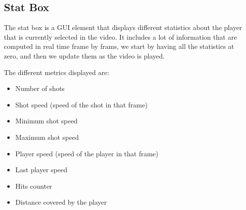 \subsection{Stat Box}

The stat box is a GUI element that displays different statistics about the player that is currently selected in the video. 
It includes a lot of information that are computed in real time frame by frams, we start by having all the statistics at zero, and then we update them as the video is played.

The different metrics displayed are:
\begin{itemize}
    \item Number of shots
    \item Shot speed (speed of the shot in that frame)
    \item Minimum shot speed
    \item Maximum shot speed
    \item Player speed (speed of the player in that frame)
    \item Last player speed
    \item Hits counter
    \item Distance covered by the player
\end{itemize}

